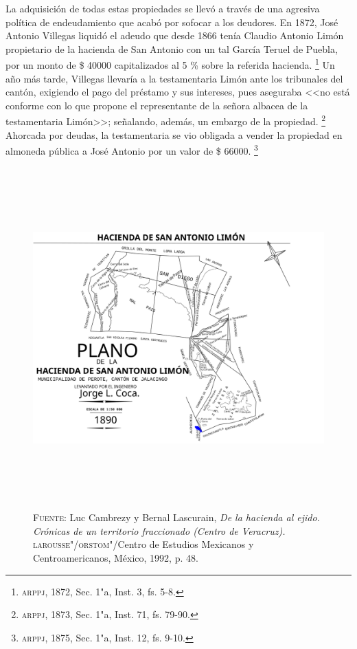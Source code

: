 \documentclass[14pt,twoside,final]{extbook} %
\let\oldfootnote\footnote
\renewcommand\footnote[1]{%
\oldfootnote{\hspace{1mm}#1}}
\begin{document}
La adquisición de todas estas propiedades se llevó a través de una agresiva política de endeudamiento que acabó por sofocar a los deudores. En 1872, José Antonio Villegas liquidó el adeudo que desde 1866 tenía Claudio Antonio Limón propietario de la hacienda de San Antonio con un tal García Teruel de Puebla, por un monto de \$ 40000 capitalizados al 5 \% sobre la referida hacienda.\footnote{\textsc{arppj}, 1872, Sec. 1"a, Inst. 3, fs. 5-8.} Un año más tarde, Villegas llevaría a la testamentaria Limón ante los tribunales del cantón, exigiendo el pago del préstamo y sus intereses, pues aseguraba <<no está conforme con lo que propone el representante de la señora albacea de la testamentaria Limón>>; señalando, además, un embargo de la propiedad.\footnote{\textsc{arppj}, 1873, Sec. 1"a, Inst. 71, fs. 79-90.} Ahorcada por deudas, la testamentaria se vio obligada a vender la propiedad en almoneda pública a José Antonio por un valor de \$ 66000.\footnote{\textsc{arppj}, 1875, Sec. 1"a, Inst. 12, fs. 9-10.}
\begin{figure}
\centering
\includegraphics[height=13.1cm]{limon}
\caption[Plano de la hacienda de San Antonio Limón]{\textsc{Fuente:} Luc Cambrezy y Bernal Lascurain, \emph{De la hacienda al ejido. Crónicas de un territorio fraccionado (Centro de Veracruz).} \textsc{larousse"/orstom}"/Centro de Estudios Mexicanos y Centroamericanos, México, 1992, p. 48.}
\label{fig:hda-limon}
\end{figure}
\end{document}
